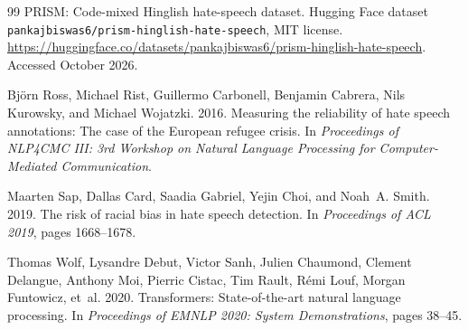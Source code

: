 \documentclass[11pt,a4paper]{article}
\begin{document}
\begin{thebibliography}{99}
PRISM: Code-mixed {Hinglish} hate-speech dataset.
\newblock Hugging Face dataset \texttt{pankajbiswas6/prism-hinglish-hate-speech}, MIT license.
\newblock \url{https://huggingface.co/datasets/pankajbiswas6/prism-hinglish-hate-speech}. Accessed October 2026.

Bj{\"o}rn Ross, Michael Rist, Guillermo Carbonell, Benjamin Cabrera, Nils Kurowsky, and Michael Wojatzki. 2016.
\newblock Measuring the reliability of hate speech annotations: The case of the {European} refugee crisis.
\newblock In \emph{Proceedings of NLP4CMC III: 3rd Workshop on Natural Language Processing for Computer-Mediated Communication}.

Maarten Sap, Dallas Card, Saadia Gabriel, Yejin Choi, and Noah~A. Smith. 2019.
\newblock The risk of racial bias in hate speech detection.
\newblock In \emph{Proceedings of ACL 2019}, pages 1668--1678.

Thomas Wolf, Lysandre Debut, Victor Sanh, Julien Chaumond, Clement Delangue, Anthony Moi, Pierric Cistac, Tim Rault, R{\'e}mi Louf, Morgan Funtowicz, et~al. 2020.
\newblock Transformers: State-of-the-art natural language processing.
\newblock In \emph{Proceedings of EMNLP 2020: System Demonstrations}, pages 38--45.

\end{thebibliography}
\end{document}
